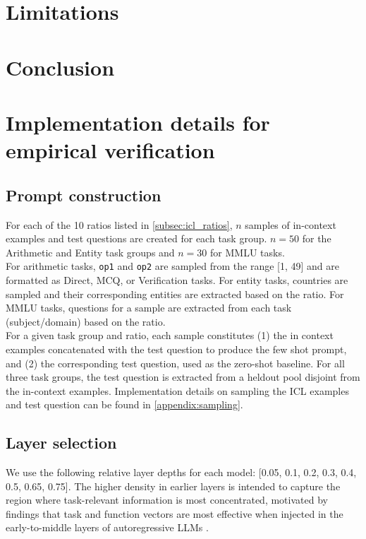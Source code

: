 \documentclass[11pt]{article}
\begin{document}
\section{Limitations}

\section{Conclusion}
\clearpage


\newpage
\onecolumn
\appendix

\section{Implementation details for empirical verification}
\label{appendix:empirical_impl}

\subsection*{Prompt construction}
For each of the 10 ratios listed in \ref{subsec:icl_ratios}, \(n\) samples of in-context examples and test questions are created for each task group. \(n = 50\) for the Arithmetic and Entity task groups and \(n = 30\) for MMLU tasks. \\[1em]
For arithmetic tasks, \texttt{op1} and \texttt{op2} are sampled from the range [1, 49] and are formatted as Direct, MCQ, or Verification tasks. For entity tasks, countries are sampled and their corresponding entities are extracted based on the ratio. For MMLU tasks, questions for a sample are extracted from each task (subject/domain) based on the ratio. \\[1em]
For a given task group and ratio, each sample constitutes (1) the in context examples concatenated with the test question to produce the few shot prompt, and (2) the corresponding test question, used as the zero-shot baseline. For all three task groups, the test question is extracted from a heldout pool disjoint from the in-context examples. Implementation details on sampling the ICL examples and test question can be found in \autoref{appendix:sampling}.

\subsection*{Layer selection}
We use the following relative layer depths for each model: [0.05, 0.1, 0.2, 0.3, 0.4, 0.5, 0.65, 0.75]. The higher density in earlier layers is intended to capture the region where task-relevant information is most concentrated, motivated by findings that task and function vectors are most effective when injected in the early-to-middle layers of autoregressive LLMs \citep{Hendel2023-yk, todd2023function}.
\end{document}
